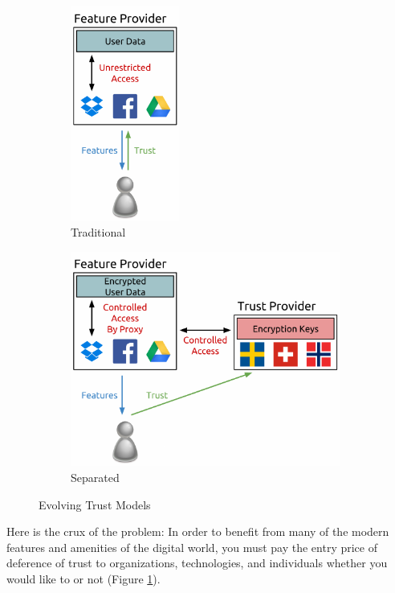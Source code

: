 \begin{figure}[!tb]
  \vspace{5ex}
  \begin{center}
    \begin{subfigure}{.32\textwidth}
      \begin{center}
        \includegraphics[height=200pt]{./figs/pdf/TrustModel-Traditional.pdf}
        \caption{Traditional}
        \label{fig:trust-traditional}
      \end{center}
    \end{subfigure}
    \begin{subfigure}{.65\textwidth}
      \begin{center}
        \includegraphics[height=200pt]{./figs/pdf/TrustModel-Seperated.pdf}
        \caption{Separated}
        \label{fig:trust-seperated}
      \end{center}
    \end{subfigure}
  \end{center}
  \caption{Evolving Trust Models}
  \label{fig:trust}
\end{figure}

Here is the crux of the problem: In order to benefit from many of the
modern features and amenities of the digital world, you must pay the
entry price of deference of trust to organizations, technologies, and
individuals whether you would like to or not (Figure
\ref{fig:trust-traditional}).

